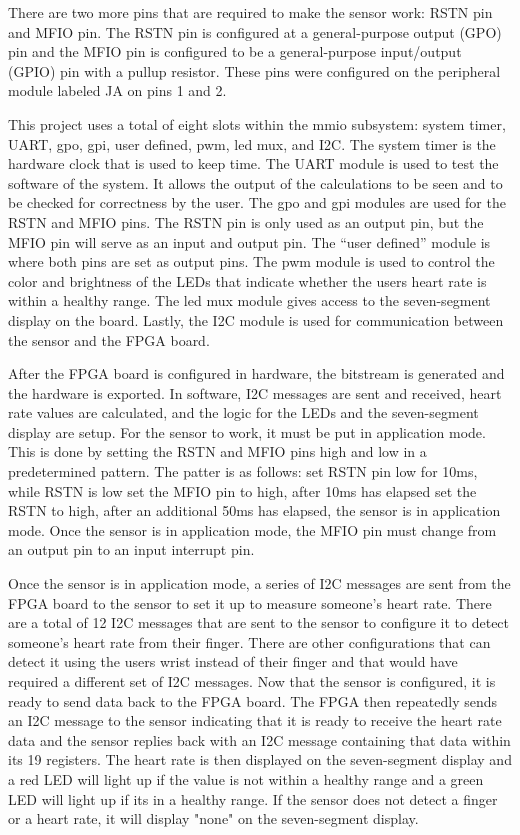 \documentclass[11pt]{article}
\begin{document}
There are two more pins that are required to make the sensor work: RSTN pin and MFIO pin. The RSTN pin is configured at a general-purpose output (GPO) pin and the MFIO pin is configured to be a general-purpose input/output (GPIO) pin with a pullup resistor. These pins were configured on the peripheral module labeled JA on pins 1 and 2. 

This project uses a total of eight slots within the mmio subsystem: system timer, UART, gpo, gpi, user defined, pwm, led mux, and I2C. The system timer is the hardware clock that is used to keep time. The UART module is used to test the software of the system. It allows the output of the calculations to be seen and to be checked for correctness by the user. The gpo and gpi modules are used for the RSTN and MFIO pins. The RSTN pin is only used as an output pin, but the MFIO pin will serve as an input and output pin. The “user defined” module is where both pins are set as output pins. The pwm module is used to control the color and brightness of the LEDs that indicate whether the users heart rate is within a healthy range. The led mux module gives access to the seven-segment display on the board. Lastly, the I2C module is used for communication between the sensor and the FPGA board. 

After the FPGA board is configured in hardware, the bitstream is generated and the hardware is exported. In software, I2C messages are sent and received, heart rate values are calculated, and the logic for the LEDs and the seven-segment display are setup. For the sensor to work, it must be put in application mode. This is done by setting the RSTN and MFIO pins high and low in a predetermined pattern. The patter is as follows: set RSTN pin low for 10ms, while RSTN is low set the MFIO pin to high, after 10ms has elapsed set the RSTN to high, after an additional 50ms has elapsed, the sensor is in application mode. Once the sensor is in application mode, the MFIO pin must change from an output pin to an input interrupt pin. 

Once the sensor is in application mode, a series of I2C messages are sent from the FPGA board to the sensor to set it up to measure someone’s heart rate. There are a total of 12 I2C messages that are sent to the sensor to configure it to detect someone's heart rate from their finger. There are other configurations that can detect it using the users wrist instead of their finger and that would have required a different set of I2C messages. Now that the sensor is configured, it is ready to send data back to the FPGA board. The FPGA then repeatedly sends an I2C message to the sensor indicating that it is ready to receive the heart rate data and the sensor replies back with an I2C message containing that data within its 19 registers. The heart rate is then displayed on the seven-segment display and a red LED will light up if the value is not within a healthy range and a green LED will light up if its in a healthy range. If the sensor does not detect a finger or a heart rate, it will display "none" on the seven-segment display. 
\end{document}
